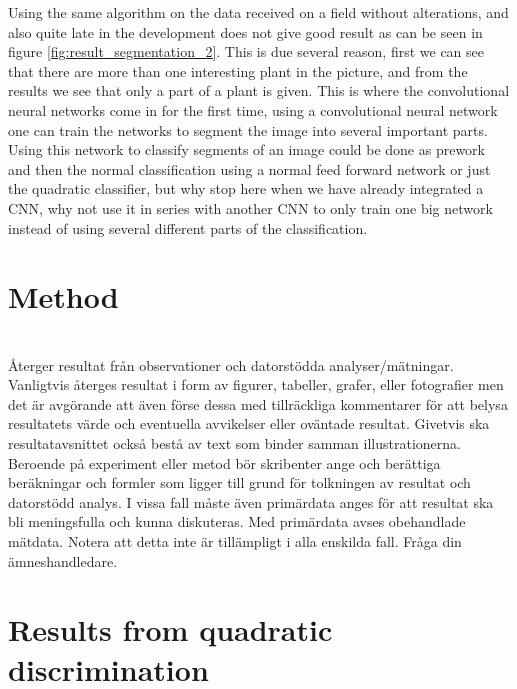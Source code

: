 Using the same algorithm on the data received on a field without alterations, and also quite late in the development does not give good result as can be seen in figure \ref{fig:result_segmentation_2}. This is due several reason, first we can see that there are more than one interesting plant in the picture, and from the results we see that only a part of a plant is given. This is where the convolutional neural networks come in for the first time, using a convolutional neural network one can train the networks to segment the image into several important parts. Using this network to classify segments of an image could be done as prework and then the normal classification using a normal feed forward network or just the quadratic classifier, but why stop here when we have already integrated a CNN, why not use it in series with another CNN to only train one big network instead of using several different parts of the classification.


\section{Method}
\section{}
Återger resultat från observationer och datorstödda
analyser/mätningar. Vanligtvis återges resultat i form av
figurer, tabeller, grafer, eller fotografier men det är avgörande
att även förse dessa med tillräckliga kommentarer för att belysa
resultatets värde och eventuella avvikelser eller oväntade
resultat. Givetvis ska resultatavsnittet också bestå av text som
binder samman illustrationerna.
Beroende på experiment eller metod bör skribenter ange och
berättiga beräkningar och formler som ligger till grund för
tolkningen av resultat och datorstödd analys. I vissa fall måste
även primärdata anges för att resultat ska bli meningsfulla och
kunna diskuteras. Med primärdata avses obehandlade mätdata.
Notera att detta inte är tillämpligt i alla enskilda fall. Fråga din
ämneshandledare.





\section{Results from quadratic discrimination}

